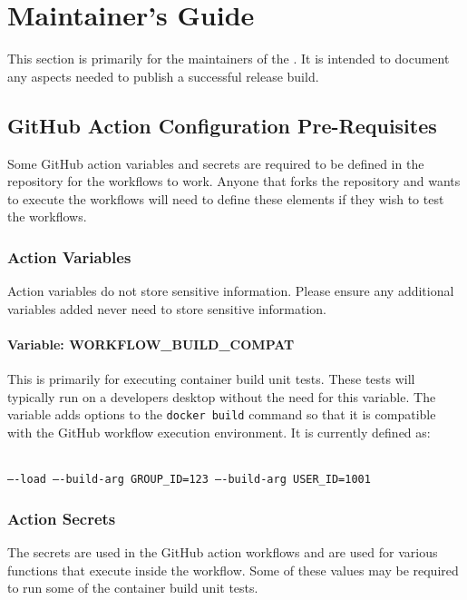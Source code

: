 \chapter{\cxtoolkit Maintainer's Guide}\label{chap:maintainers_guide}


This section is primarily for the maintainers of the \cxtoolkit.  It is intended
to document any aspects needed to publish a successful release build.


\section{GitHub Action Configuration Pre-Requisites}

Some GitHub action variables and secrets are required to be defined in the repository
for the workflows to work.  Anyone that forks the repository and wants to execute
the workflows will need to define these elements if they wish to test the workflows.

\subsection{Action Variables}

Action variables do not store sensitive information.  Please ensure any additional
variables added never need to store sensitive information.

\subsubsection{Variable: WORKFLOW\_BUILD\_COMPAT}

This is primarily for executing container build unit tests.  These tests will typically
run on a developers desktop without the need for this variable.  The variable adds options
to the \texttt{docker build} command so that it is compatible with the GitHub workflow
execution environment.  It is currently defined as:

\noindent\\\texttt{----load ----build-arg GROUP\_ID=123 ----build-arg USER\_ID=1001}

\subsection{Action Secrets}

The secrets are used in the GitHub action workflows and are used for various functions
that execute inside the workflow.  Some of these values may be required to run some
of the container build unit tests.

